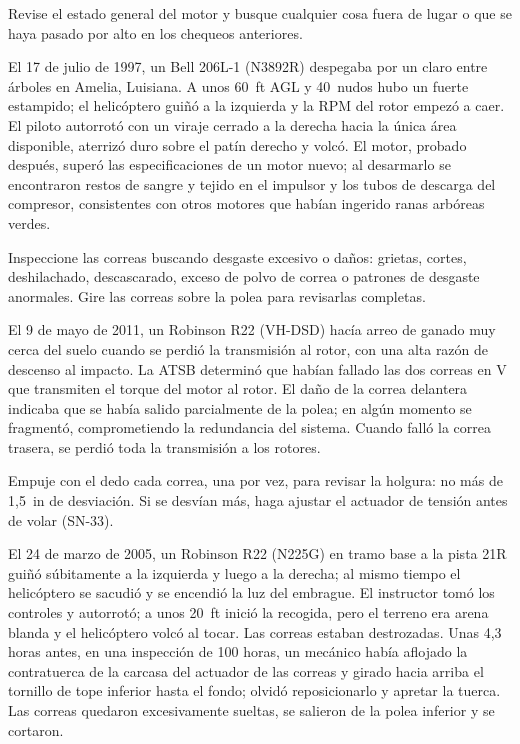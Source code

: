 Revise el estado general del motor y busque cualquier cosa fuera de lugar o que se haya pasado por alto en los chequeos anteriores.

\begin{caso}
El 17 de julio de 1997, un Bell 206L-1 (N3892R) despegaba por un claro entre árboles en Amelia, Luisiana. A unos 60~ft AGL y 40~nudos hubo un fuerte estampido; el helicóptero guiñó a la izquierda y la RPM del rotor empezó a caer. El piloto autorrotó con un viraje cerrado a la derecha hacia la única área disponible, aterrizó duro sobre el patín derecho y volcó. El motor, probado después, superó las especificaciones de un motor nuevo; al desarmarlo se encontraron restos de sangre y tejido en el impulsor y los tubos de descarga del compresor, consistentes con otros motores que habían ingerido ranas arbóreas verdes.
\end{caso}

Inspeccione las correas buscando desgaste excesivo o daños: grietas, cortes, deshilachado, descascarado, exceso de polvo de correa o patrones de desgaste anormales. Gire las correas sobre la polea para revisarlas completas.

\begin{caso}
El 9 de mayo de 2011, un Robinson R22 (VH-DSD) hacía arreo de ganado muy cerca del suelo cuando se perdió la transmisión al rotor, con una alta razón de descenso al impacto. La ATSB determinó que habían fallado las dos correas en V que transmiten el torque del motor al rotor. El daño de la correa delantera indicaba que se había salido parcialmente de la polea; en algún momento se fragmentó, comprometiendo la redundancia del sistema. Cuando falló la correa trasera, se perdió toda la transmisión a los rotores.
\end{caso}

Empuje con el dedo cada correa, una por vez, para revisar la holgura: no más de 1,5~in de desviación. Si se desvían más, haga ajustar el actuador de tensión antes de volar (SN-33).

\begin{caso}
El 24 de marzo de 2005, un Robinson R22 (N225G) en tramo base a la pista 21R guiñó súbitamente a la izquierda y luego a la derecha; al mismo tiempo el helicóptero se sacudió y se encendió la luz del embrague. El instructor tomó los controles y autorrotó; a unos 20~ft inició la recogida, pero el terreno era arena blanda y el helicóptero volcó al tocar. Las correas estaban destrozadas. Unas 4,3 horas antes, en una inspección de 100 horas, un mecánico había aflojado la contratuerca de la carcasa del actuador de las correas y girado hacia arriba el tornillo de tope inferior hasta el fondo; olvidó reposicionarlo y apretar la tuerca. Las correas quedaron excesivamente sueltas, se salieron de la polea inferior y se cortaron.
\end{caso}

